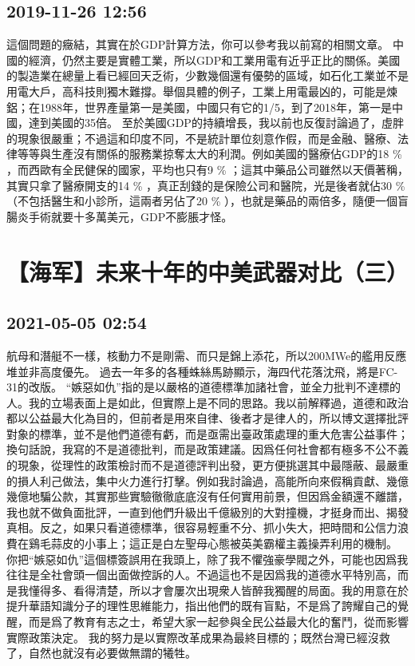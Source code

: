 \documentclass[twocolumn]{ctexart}
\begin{document}
\subsection*{2019-11-26 12:56}

這個問題的癥結，其實在於GDP計算方法，你可以參考我以前寫的相關文章。 
中國的經濟，仍然主要是實體工業，所以GDP和工業用電有近乎正比的關係。美國的製造業在總量上看已經回天乏術，少數幾個還有優勢的區域，如石化工業並不是用電大戶，高科技則獨木難撐。舉個具體的例子，工業上用電最凶的，可能是煉鋁；在1988年，世界產量第一是美國，中國只有它的1/5，到了2018年，第一是中國，達到美國的35倍。 
至於美國GDP的持續增長，我以前也反復討論過了，虛胖的現象很嚴重；不過這和印度不同，不是統計單位刻意作假，而是金融、醫療、法律等等與生產沒有關係的服務業掠奪太大的利潤。例如美國的醫療佔GDP的18 \% ，而西歐有全民健保的國家，平均也只有9 \% ；這其中藥品公司雖然以天價著稱，其實只拿了醫療開支的14 \% ，真正刮錢的是保險公司和醫院，光是後者就佔30 \% （不包括醫生和小診所，這兩者另佔了20 \% ），也就是藥品的兩倍多，隨便一個盲腸炎手術就要十多萬美元，GDP不膨脹才怪。
\section*{【海军】未来十年的中美武器对比（三）}
\subsection*{2021-05-05 02:54}

航母和潛艇不一樣，核動力不是剛需、而只是錦上添花，所以200MWe的艦用反應堆並非高度優先。
過去一年多的各種蛛絲馬跡顯示，海四代花落沈飛，將是FC-31的改版。
“嫉惡如仇”指的是以嚴格的道德標準加諸社會，並全力批判不達標的人。我的立場表面上是如此，但實際上是不同的思路。我以前解釋過，道德和政治都以公益最大化為目的，但前者是用來自律、後者才是律人的，所以博文選擇批評對象的標準，並不是他們道德有虧，而是亟需出臺政策處理的重大危害公益事件；換句話說，我寫的不是道德批判，而是政策建議。因爲任何社會都有極多不公不義的現象，從理性的政策檢討而不是道德評判出發，更方便挑選其中最隱蔽、最嚴重的損人利己做法，集中火力進行打擊。例如我討論過，高能所向來假稱貢獻、幾億幾億地騙公款，其實那些實驗徹徹底底沒有任何實用前景，但因爲金額還不離譜，我也就不做負面批評，一直到他們升級出千億級別的大對撞機，才挺身而出、揭發真相。反之，如果只看道德標準，很容易輕重不分、抓小失大，把時間和公信力浪費在鷄毛蒜皮的小事上；這正是白左聖母心態被英美霸權主義操弄利用的機制。
你把“嫉惡如仇”這個標簽誤用在我頭上，除了我不懼強豪學閥之外，可能也因爲我往往是全社會頭一個出面做控訴的人。不過這也不是因爲我的道德水平特別高，而是我懂得多、看得清楚，所以才會屢次出現衆人皆醉我獨醒的局面。我的用意在於提升華語知識分子的理性思維能力，指出他們的既有盲點，不是爲了誇耀自己的覺醒，而是爲了教育有志之士，希望大家一起參與全民公益最大化的奮鬥，從而影響實際政策決定。
我的努力是以實際改革成果為最終目標的；既然台灣已經沒救了，自然也就沒有必要做無謂的犧牲。
\end{document}
